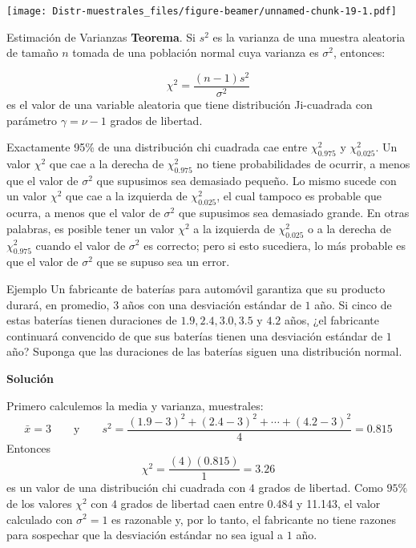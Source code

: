 \documentclass[
  10pt,
  ignorenonframetext,
]{beamer}
\begin{document}
\begin{frame}{}
\protect\hypertarget{section-49}{}
\texttt{[image: Distr-muestrales\_files/figure-beamer/unnamed-chunk-19-1.pdf]}
\end{frame}

\begin{frame}{}
\protect\hypertarget{section-50}{}
\begin{block}{Estimación de Varianzas}
\protect\hypertarget{estimaciuxf3n-de-varianzas}{}
\textbf{Teorema}. Si \(s^2\) es la varianza de una muestra aleatoria de
tamaño \(n\) tomada de una población normal cuya varianza es
\(\sigma^2\), entonces:

\[\chi^2=\frac{(n-1)s^2}{\sigma^2}\] es el valor de una variable
aleatoria que tiene distribución Ji-cuadrada con parámetro
\(\gamma = \nu - 1\) grados de libertad.

\bigskip

Exactamente 95\% de una distribución chi cuadrada cae entre
\(\chi_{0.975}^2\) y \(\chi_{0.025}^2\). Un valor \(\chi^2\) que cae a
la derecha de \(\chi_{0.975}^2\) no tiene probabilidades de ocurrir, a
menos que el valor de \(\sigma^2\) que supusimos sea demasiado pequeño.
Lo mismo sucede con un valor \(\chi^2\) que cae a la izquierda de
\(\chi_{0.025}^2\), el cual tampoco es probable que ocurra, a menos que
el valor de \(\sigma^2\) que supusimos sea demasiado grande. En otras
palabras, es posible tener un valor \(\chi^2\) a la izquierda de
\(\chi_{0.025}^2\) o a la derecha de \(\chi_{0.975}^2\) cuando el valor
de \(\sigma^2\) es correcto; pero si esto sucediera, lo más probable es
que el valor de \(\sigma^2\) que se supuso sea un error.
\end{block}
\end{frame}

\begin{frame}{}
\protect\hypertarget{section-51}{}
\begin{block}{Ejemplo}
\protect\hypertarget{ejemplo-2}{}
Un fabricante de baterías para automóvil garantiza que su producto
durará, en promedio, \(3\) años con una desviación estándar de \(1\)
año. Si cinco de estas baterías tienen duraciones de
\(1.9, 2.4, 3.0, 3.5\mbox{ y }4.2\) años, ¿el fabricante continuará
convencido de que sus baterías tienen una desviación estándar de \(1\)
año? Suponga que las duraciones de las baterías siguen una distribución
normal.

\textbf{Solución}

Primero calculemos la media y varianza, muestrales:
\[\bar{x}=3 \qquad \mbox{y} \qquad s^2 = \frac{(1.9-3)^2 + (2.4-3)^2 + \cdots + (4.2-3)^2}{4}=0.815\]
Entonces \[\chi^2=\frac{(4)(0.815)}{1}=3.26\] es un valor de una
distribución chi cuadrada con \(4\) grados de libertad. Como \(95\%\) de
los valores \(\chi^2\) con \(4\) grados de libertad caen entre 0.484 y
11.143, el valor calculado con \(\sigma^2 = 1\) es razonable y, por lo
tanto, el fabricante no tiene razones para sospechar que la desviación
estándar no sea igual a \(1\) año.
\end{block}
\end{frame}
\end{document}
